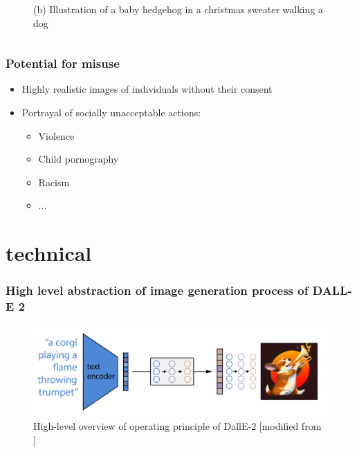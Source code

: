 \documentclass[
	11pt, compress%
]{beamer}
\begin{document}
\begin{frame}
\begin{columns}[c]
\begin{column}{0.5\textwidth}
\begin{figure}
				\caption{(b) Illustration of a baby hedgehog in a christmas sweater walking a dog \cite{DBLP:journals/corr/abs-2102-12092}} 
			\end{figure}
		\end{column}
	\end{columns}
\end{frame}



\begin{frame}
	\frametitle{Potential for misuse}
	\begin{itemize}
			\item{Highly realistic images of individuals without their consent}
			\item{Portrayal of socially unacceptable actions:}
			\begin{itemize}
			\item{Violence}
			\item{Child pornography}
			\item{Racism}
			\item{...}
			\end{itemize}
	\end{itemize}
\end{frame}

\section{technical}

\begin{frame}
	\frametitle{High level abstraction of image generation process of DALL-E 2}
	\begin{figure}
		\includegraphics[width=0.85\linewidth]{Images/highLevel.png}
		\caption{High-level overview of operating principle of DallE-2 [modified from \cite{https://doi.org/10.48550/arxiv.2204.06125}]}
	\end{figure}
\end{frame}
\end{document}

